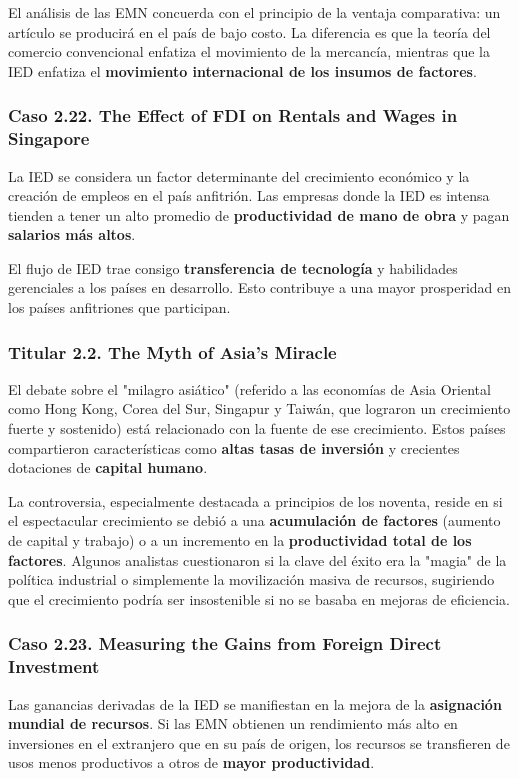 El análisis de las EMN concuerda con el principio de la ventaja comparativa: un artículo se producirá en el país de bajo costo. La diferencia es que la teoría del comercio convencional enfatiza el movimiento de la mercancía, mientras que la IED enfatiza el \textbf{movimiento internacional de los insumos de factores}.

\subsubsection{Caso 2.22. The Effect of FDI on Rentals and Wages in Singapore}
La IED se considera un factor determinante del crecimiento económico y la creación de empleos en el país anfitrión. Las empresas donde la IED es intensa tienden a tener un alto promedio de \textbf{productividad de mano de obra} y pagan \textbf{salarios más altos}.

\begin{propuesta}
El flujo de IED trae consigo \textbf{transferencia de tecnología} y habilidades gerenciales a los países en desarrollo. Esto contribuye a una mayor prosperidad en los países anfitriones que participan.
\end{propuesta}

\subsubsection{Titular 2.2. The Myth of Asia’s Miracle}
El debate sobre el "milagro asiático" (referido a las economías de Asia Oriental como Hong Kong, Corea del Sur, Singapur y Taiwán, que lograron un crecimiento fuerte y sostenido) está relacionado con la fuente de ese crecimiento. Estos países compartieron características como \textbf{altas tasas de inversión} y crecientes dotaciones de \textbf{capital humano}.

La controversia, especialmente destacada a principios de los noventa, reside en si el espectacular crecimiento se debió a una \textbf{acumulación de factores} (aumento de capital y trabajo) o a un incremento en la \textbf{productividad total de los factores}. Algunos analistas cuestionaron si la clave del éxito era la "magia" de la política industrial o simplemente la movilización masiva de recursos, sugiriendo que el crecimiento podría ser insostenible si no se basaba en mejoras de eficiencia.

\subsubsection{Caso 2.23. Measuring the Gains from Foreign Direct Investment}
Las ganancias derivadas de la IED se manifiestan en la mejora de la \textbf{asignación mundial de recursos}. Si las EMN obtienen un rendimiento más alto en inversiones en el extranjero que en su país de origen, los recursos se transfieren de usos menos productivos a otros de \textbf{mayor productividad}.

